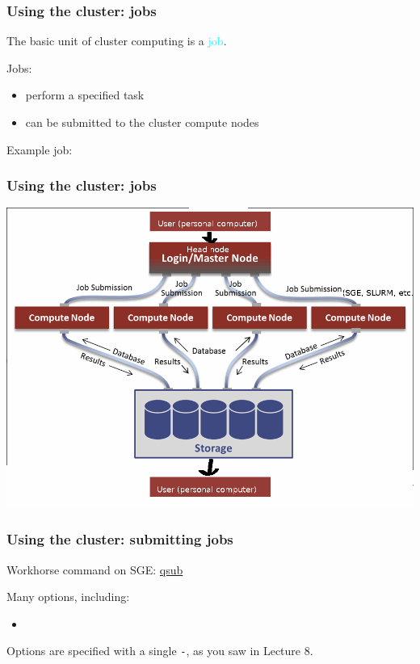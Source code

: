 \documentclass[12pt, 
hyperref={colorlinks=true, linkcolor=BlueViolet, urlcolor=BlueViolet},dvipsnames]{beamer}
\begin{document}
\begin{frame}
\frametitle{Using the cluster: jobs}
The basic unit of cluster computing is a \textcolor{cyan}{job}. \pause

Jobs: \vspace{-0.3cm} \pause
\begin{itemize}
\item perform a specified task \pause
\item can be submitted to the cluster compute nodes \pause
\end{itemize}

Example job: 
\end{frame}

\begin{frame}
\frametitle{Using the cluster: jobs}
\begin{center}
\includegraphics[width = 1\textwidth]{plots/hpc_system.png}
\end{center}
\end{frame}

\begin{frame}
\frametitle{Using the cluster: submitting jobs}
Workhorse command on SGE: \href{http://gridscheduler.sourceforge.net/htmlman/htmlman1/qsub.html}{qsub}

Many options, including: \vspace{-0.3cm} \pause
\begin{itemize}
\item 
\end{itemize}

Options are specified with a single \texttt{-}, as you saw in Lecture 8.
\end{frame}
\end{document}
